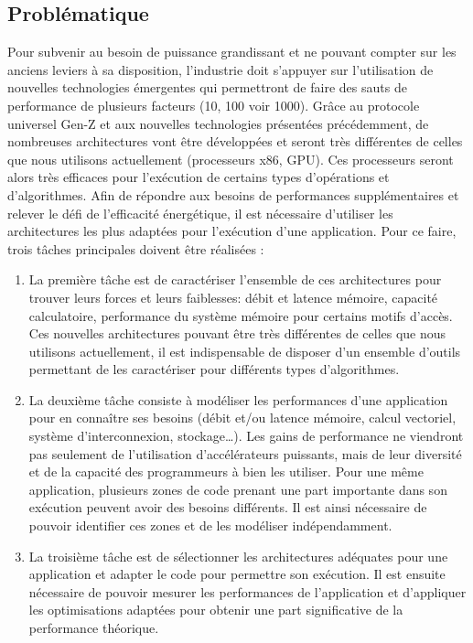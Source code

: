     \subsection{Problématique}
    
        Pour subvenir au besoin de puissance grandissant et ne pouvant compter sur les anciens leviers à sa disposition, l'industrie doit s'appuyer sur l'utilisation de nouvelles technologies émergentes qui permettront de faire des sauts de performance de plusieurs facteurs (10, 100 voir 1000).
        Grâce au protocole universel Gen-Z et aux nouvelles technologies présentées précédemment, de nombreuses architectures vont être développées et seront très différentes de celles que nous utilisons actuellement (processeurs x86, GPU). Ces processeurs seront alors très efficaces pour l'exécution de certains types d'opérations et d'algorithmes. Afin de répondre aux besoins de performances supplémentaires et relever le défi de l'efficacité énergétique, il est nécessaire d'utiliser les architectures les plus adaptées pour l'exécution d'une application. Pour ce faire, trois tâches principales doivent être réalisées :
        \begin{enumerate}
            \item La première tâche est de caractériser l'ensemble de ces architectures pour trouver leurs forces et leurs faiblesses: débit et latence mémoire, capacité calculatoire, performance du système mémoire pour certains motifs d'accès. Ces nouvelles architectures pouvant être très différentes de celles que nous utilisons actuellement, il est indispensable de disposer d'un ensemble d'outils permettant de les caractériser pour différents types d'algorithmes.
        
            \item La deuxième tâche consiste à modéliser les performances d'une application pour en connaître ses besoins (débit et/ou latence mémoire, calcul vectoriel, système d'interconnexion, stockage…). Les gains de performance ne viendront pas seulement de l'utilisation d'accélérateurs puissants, mais de leur diversité et de la capacité des programmeurs à bien les utiliser. Pour une même application, plusieurs zones de code prenant une part importante dans son exécution peuvent avoir des besoins différents. Il est ainsi nécessaire de pouvoir identifier ces zones et de les modéliser indépendamment. 
        
            \item La troisième tâche est de sélectionner les architectures adéquates pour une application et adapter le code pour permettre son exécution. Il est ensuite nécessaire de pouvoir mesurer les performances de l'application et d'appliquer les optimisations adaptées pour obtenir une part significative de la performance théorique.
        \end{enumerate}
    
